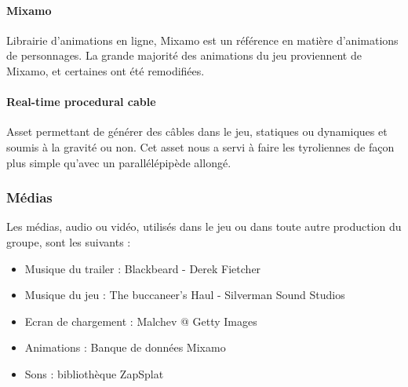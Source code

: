         \paragraph{Mixamo} Librairie d'animations en ligne, Mixamo est un référence en matière d'animations de personnages. La grande 
        majorité des animations du jeu proviennent de Mixamo, et certaines ont été remodifiées.

        \paragraph{Real-time procedural cable} Asset permettant de générer des câbles dans le jeu, statiques ou dynamiques et soumis 
        à la gravité ou non. Cet asset nous a servi à faire les tyroliennes de façon plus simple qu'avec un parallélépipède allongé. 

        
    \subsubsection{Médias}

        Les médias, audio ou vidéo, utilisés dans le jeu ou dans toute autre production du groupe, sont les suivants :

        \begin{itemize}
            \item Musique du trailer : Blackbeard - Derek Fietcher
            \item Musique du jeu : The buccaneer's Haul - Silverman Sound Studios
            \item Ecran de chargement : Malchev @ Getty Images
            \item Animations : Banque de données Mixamo
            \item Sons : bibliothèque ZapSplat
        \end{itemize}